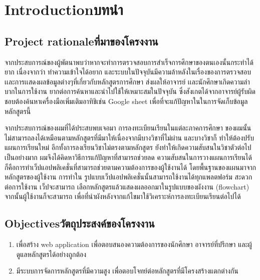 \chapter{\ifenglish Introduction\else บทนำ\fi}

\section{\ifenglish Project rationale\else ที่มาของโครงงาน\fi}

จากประสบการณ์ของผู้พัตนาพบว่าหากจะทำการตรวจสอบการสำเร็จการศึกษาของตนเองนั้นกระทำได้ยาก เนื่องจากว่า ทำความเข้าใจได้อยาก และระบบในปัจจุบันมีความล้าหลังในเรื่องของการตรวจสอบ เเละการเเสดงผลข้อมูลต่างๆที่เกี่ยวกับหลักสูตรการศึกษา ส่งผลให้อาจารย์ เเละนักศึกษาเกิดความลําบากในการใช้งาน  ยากต่อการค้นหาและนําไปใช้ให้เหมาะสมในปัจจุบัน ซึ่งสังเกตได้จากอาจารย์ผู้รับผิดชอบต้องค้นหาเครื่องมือเพิ่มเติมอาทิชิเช่น Google sheet เพื่อที่จะแก้ปัญหาในในการจัดเก็บข้อมูลหลักสูตรนี้


จากประสบการณ์ของผมที่ได้ประสบพบเจอมา การลงทะเบียนเรียนในแต่ละภาคการศึกษา
ของผมนั้นไม่สามารถลงได้เหมือนตามหลักสูตรที่มีมาให้เนื่องจากมีบางวิชาที่ไม่ผ่าน และบางวิชาก็
 ทำให้ต้องปรับแผนการเรียนใหม่ อีกทั้งการลงเรียนวิชาไม่ตรงตามหลักสูตร
ยังทำให้เกิดความสับสนในวิชาตัวต่อไปเป็นอย่างมาก ผมจึงได้คิดหาวิธีการแก้ปัญหาที่สามารถช่วยลด
ความสับสนในการวางแผนการเรียนได้ ก็คือการทำเว็ปแอปพลิเคชั่นที่สามารถช่วยตามความต้องการของผู้ใช้งานได้ โดยพื้นฐานของแผนมาจากหลักสูตรของผู้ใช้งาน การทำใน
รูปแบบเว็ปแอปพลิเคชั่นนั้นสามารถใช้งานได้ทุกแพลตฟอร์ม สะดวกต่อการใช้งาน เว็ปจะสามารถ
เลือกหลักสูตรแล้วแสดงผลออกมาในรูปแบบของผังงาน (flowchart) จากนั้นผู้ใช้งานก็จะสามารถ
 เพื่อที่นำผังหลังจากแก้ไขมาใช้วิเคราะห์การลงทะเบียนเรียนต่อไปได้

\section{\ifenglish Objectives\else วัตถุประสงค์ของโครงงาน\fi}
\begin{enumerate}
    \item เพื่อสร้าง web application  เพื่อตอบสนองความต้องการของนักศึกษา อาจารย์ที่ปรึกษา และผู้ดูแลหลักสูตรได้อย่างถูกต้อง
    \item มีระบบการจัดการหลักสูตรที่มีความสูง เพื่อตอบโจทย์ต่อหลักสูตรที่มีโครงสร้างแตกต่างกัน
\end{enumerate}

